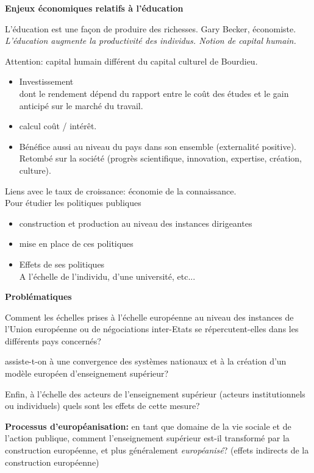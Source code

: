 \textbf{Enjeux économiques relatifs à l'éducation}

L'éducation est une façon de produire des richesses. Gary Becker, économiste.
\emph{L'éducation augmente la productivité des individus. Notion de capital humain.}

Attention: capital humain différent du capital culturel de Bourdieu.


\begin{itemize}
\item Investissement\\
dont le rendement dépend du rapport entre le coût des études et le gain anticipé sur le marché du travail.
\item calcul coût / intérêt.
\item Bénéfice aussi au niveau du pays dans son ensemble (externalité positive).\\
Retombé sur la société (progrès scientifique, innovation, expertise, création, culture).
\end{itemize}

Liens avec le taux de croissance: économie de la connaissance.\\

Pour étudier les politiques publiques
\begin{itemize}
\item construction et production au niveau des instances dirigeantes
\item mise en place de ces politiques
\item Effets de ses politiques\\
A l'échelle de l'individu, d'une université, etc...
\end{itemize}


\textbf{Problématiques}

Comment les échelles prises à l'échelle européenne au niveau des instances de l'Union européenne ou de négociations inter-Etats se répercutent-elles dans les différents pays concernés? 

assiste-t-on à une convergence des systèmes nationaux et à la création d'un modèle européen d'enseignement supérieur? 

Enfin, à l'échelle des acteurs de l'enseignement supérieur (acteurs institutionnels ou individuels) quels sont les effets de cette mesure?

\textbf{Processus d'européanisation:} en tant que domaine de la vie sociale et de l'action publique, comment l'enseignement supérieur est-il transformé par la construction européenne, et plus généralement \emph{européanisé}? (effets indirects de la construction européenne)


